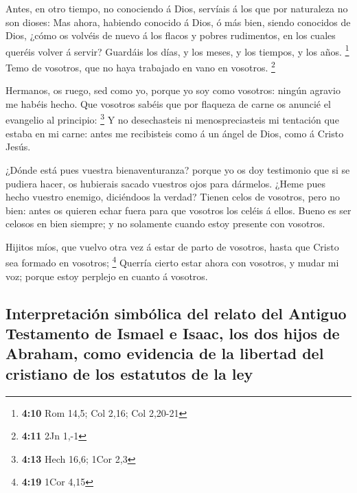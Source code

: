  Antes, en otro tiempo, no conociendo á Dios, servíais á
los que por naturaleza no son dioses:  Mas ahora, habiendo
conocido á Dios, ó más bien, siendo conocidos de Dios, ¿cómo os volvéis
de nuevo á los flacos y pobres rudimentos, en los cuales queréis volver
á servir?  Guardáis los días, y los meses, y los tiempos,
y los años. \footnote{\textbf{4:10} Rom 14,5; Col 2,16; Col 2,20-21}
 Temo de vosotros, que no haya trabajado en vano en
vosotros. \footnote{\textbf{4:11} 2Jn 1,-1}

 Hermanos, os ruego, sed como yo, porque yo soy como
vosotros: ningún agravio me habéis hecho.  Que vosotros
sabéis que por flaqueza de carne os anuncié el evangelio al principio:
\footnote{\textbf{4:13} Hech 16,6; 1Cor 2,3}  Y no
desechasteis ni menospreciasteis mi tentación que estaba en mi carne:
antes me recibisteis como á un ángel de Dios, como á Cristo Jesús.

 ¿Dónde está pues vuestra bienaventuranza? porque yo os
doy testimonio que si se pudiera hacer, os hubierais sacado vuestros
ojos para dármelos.  ¿Heme pues hecho vuestro enemigo,
diciéndoos la verdad?  Tienen celos de vosotros, pero no
bien: antes os quieren echar fuera para que vosotros los celéis á ellos.
 Bueno es ser celosos en bien siempre; y no solamente
cuando estoy presente con vosotros.

 Hijitos míos, que vuelvo otra vez á estar de parto de
vosotros, hasta que Cristo sea formado en vosotros; \footnote{\textbf{4:19}
  1Cor 4,15}  Querría cierto estar ahora con vosotros, y
mudar mi voz; porque estoy perplejo en cuanto á vosotros.

\hypertarget{interpretaciuxf3n-simbuxf3lica-del-relato-del-antiguo-testamento-de-ismael-e-isaac-los-dos-hijos-de-abraham-como-evidencia-de-la-libertad-del-cristiano-de-los-estatutos-de-la-ley}{%
\subsection{Interpretación simbólica del relato del Antiguo Testamento
de Ismael e Isaac, los dos hijos de Abraham, como evidencia de la
libertad del cristiano de los estatutos de la
ley}\label{interpretaciuxf3n-simbuxf3lica-del-relato-del-antiguo-testamento-de-ismael-e-isaac-los-dos-hijos-de-abraham-como-evidencia-de-la-libertad-del-cristiano-de-los-estatutos-de-la-ley}}

